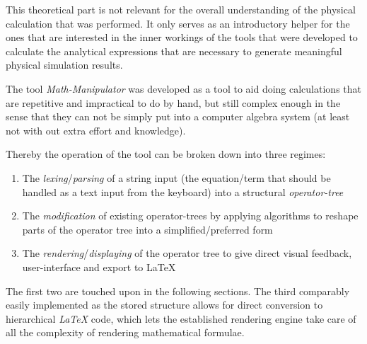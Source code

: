 This theoretical part is not relevant for the overall understanding of the physical calculation that was performed.
It only serves as an introductory helper for the ones that are interested in the inner workings of the tools that were developed to calculate the analytical expressions that are necessary to generate meaningful physical simulation results.

The tool \emph{Math-Manipulator} was developed as a tool to aid doing calculations that are repetitive and impractical to do by hand, but still complex enough in the sense that they can not be simply put into a computer algebra system (at least not with out extra effort and knowledge).

Thereby the operation of the tool can be broken down into three regimes: 
\begin{enumerate}
    \item The \emph{lexing}/\emph{parsing} of a string input (the equation/term that should be handled as a text input from the keyboard) into a structural \emph{operator-tree} 
    \item The \emph{modification} of existing operator-trees by applying algorithms to reshape parts of the operator tree into a simplified/preferred form
    \item The \emph{rendering}/\emph{displaying} of the operator tree to give direct visual feedback, user-interface and export to \LaTeX
\end{enumerate}

The first two are touched upon in the following sections. 
The third comparably easily implemented as the stored structure allows for direct conversion to hierarchical \emph{LaTeX} code, which lets the established rendering engine take care of all the complexity of rendering mathematical formulae.
